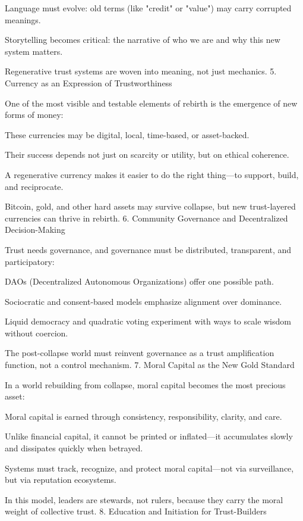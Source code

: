 \documentclass[11pt,oneside]{book}
\begin{document}
    Language must evolve: old terms (like "credit" or "value") may carry corrupted meanings.

    Storytelling becomes critical: the narrative of who we are and why this new system matters.

Regenerative trust systems are woven into meaning, not just mechanics.
5. Currency as an Expression of Trustworthiness

One of the most visible and testable elements of rebirth is the emergence of new forms of money:

    These currencies may be digital, local, time-based, or asset-backed.

    Their success depends not just on scarcity or utility, but on ethical coherence.

    A regenerative currency makes it easier to do the right thing—to support, build, and reciprocate.

Bitcoin, gold, and other hard assets may survive collapse, but new trust-layered currencies can thrive in rebirth.
6. Community Governance and Decentralized Decision-Making

Trust needs governance, and governance must be distributed, transparent, and participatory:

    DAOs (Decentralized Autonomous Organizations) offer one possible path.

    Sociocratic and consent-based models emphasize alignment over dominance.

    Liquid democracy and quadratic voting experiment with ways to scale wisdom without coercion.

The post-collapse world must reinvent governance as a trust amplification function, not a control mechanism.
7. Moral Capital as the New Gold Standard

In a world rebuilding from collapse, moral capital becomes the most precious asset:

    Moral capital is earned through consistency, responsibility, clarity, and care.

    Unlike financial capital, it cannot be printed or inflated—it accumulates slowly and dissipates quickly when betrayed.

    Systems must track, recognize, and protect moral capital—not via surveillance, but via reputation ecosystems.

In this model, leaders are stewards, not rulers, because they carry the moral weight of collective trust.
8. Education and Initiation for Trust-Builders
\end{document}
